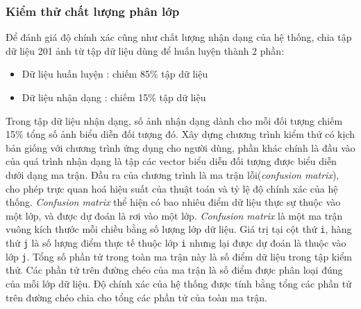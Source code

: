 \documentclass[12pt,a4paper]{article}
\begin{document}
\subsubsection{Kiểm thử chất lượng phân lớp}
Để đánh giá độ chính xác cũng như chất lượng nhận dạng của hệ thống, chia tập dữ liệu 201 ảnh từ tập dữ liệu dùng để huấn luyện thành 2 phần: \par 
\begin{itemize}
\item Dữ liệu huấn luyện : chiếm 85\% tập dữ liệu
\item Dữ liệu nhận dạng : chiếm 15\% tập dữ liệu
\end{itemize}
\par 
Trong tập dữ liệu nhận dạng, số ảnh nhận dạng dành cho mỗi đối tượng chiếm 15\% tổng số ảnh biểu diễn đối tượng đó. Xây dựng chương trình kiểm thử có kịch bản giống với chương trình ứng dụng cho người dùng, phần khác chính là đầu vào của quá trình nhận dạng là tập các vector biểu diễn đối tượng được biểu diễn dưới dạng ma trận. Đầu ra của chương trình là ma trận lỗi(\textit{confusion matrix}), cho phép trực quan hoá hiệu suất của thuật toán và tỷ lệ độ chính xác của hệ thống. \textit{Confusion matrix} thể hiện có bao nhiêu điểm dữ liệu thực sự thuộc vào một lớp, và được dự đoán là rơi vào một lớp. \textit{Confusion matrix} là một ma trận vuông kích thước mỗi chiều bằng số lượng lớp dữ liệu. Giá trị tại cột thứ \texttt{i}, hàng thứ \texttt{j} là số lượng điểm thực tế thuộc lớp \texttt{i} nhưng lại được dự đoán là thuộc vào lớp \texttt{j}. Tổng số phần tử trong toàn ma trận này là số điểm dữ liệu trong tập kiểm thử. Các phần tử trên đường chéo của ma trận là số điểm được phân loại đúng của mỗi lớp dữ liệu. Độ chính xác của hệ thống được tính bằng tổng các phần tử trên đường chéo chia cho tổng các phần tử của toàn ma trận.  
\end{document}
